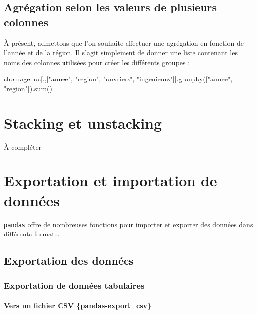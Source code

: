 \documentclass[12pt,]{book}
\newenvironment{Shaded}{\begin{snugshade}}{\end{snugshade}}
\newcommand{\StringTok}[1]{\textcolor[rgb]{0.31,0.60,0.02}{#1}}
\newcommand{\BuiltInTok}[1]{#1}
\newcommand{\NormalTok}[1]{#1}
\let\oldparagraph\paragraph
\renewcommand{\paragraph}[1]{\oldparagraph{#1}\mbox{}}
\numberwithin{equation}{section}
\numberwithin{countremarque}{section}
\begin{document}
\subsection{Agrégation selon les valeurs de plusieurs
colonnes}\label{agregation-selon-les-valeurs-de-plusieurs-colonnes}

À présent, admettons que l'on souhaite effectuer une agrégation en
fonction de l'année et de la région. Il s'agit simplement de donner une
liste contenant les noms des colonnes utilisées pour créer les
différents groupes :

\begin{Shaded}
\begin{Highlighting}[]
\NormalTok{chomage.loc[:,[}\StringTok{"annee"}\NormalTok{, }\StringTok{"region"}\NormalTok{,}
               \StringTok{"ouvriers"}\NormalTok{, }\StringTok{"ingenieurs"}\NormalTok{]].groupby([}\StringTok{"annee"}\NormalTok{,}
                                                   \StringTok{"region"}\NormalTok{]).}\BuiltInTok{sum}\NormalTok{()}
\end{Highlighting}
\end{Shaded}

\section{Stacking et unstacking}\label{stacking-et-unstacking}

À compléter

\section{Exportation et importation de
données}\label{exportation-et-importation-de-donnees}

\texttt{pandas} offre de nombreuses fonctions pour importer et exporter
des données dans différents formats.

\subsection{Exportation des données}\label{exportation-des-donnees}

\subsubsection{Exportation de données
tabulaires}\label{exportation-de-donnees-tabulaires}

\paragraph{Vers un fichier CSV
\{pandas-export\_csv\}}\label{vers-un-fichier-csv-pandas-export_csv}
\end{document}
